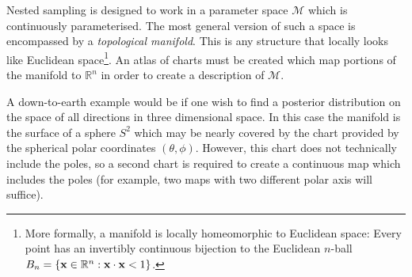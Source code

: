 Nested sampling is designed to work in a parameter space $\mathcal{M}$ which is continuously parameterised. The most general version of such a space is encompassed by a {\em topological manifold}. This is any structure that locally looks like Euclidean space\footnote{More formally, a manifold is locally homeomorphic to Euclidean space: Every point has an invertibly continuous bijection to the Euclidean $n$-ball $B_n = \{ \mathbf{x}\in\mathbb{R}^n : \mathbf{x}\cdot\mathbf{x}<1\}$.}. An atlas of charts must be created which map portions of the manifold to $\mathbb{R}^n$ in order to create a description of $\mathcal{M}$.

A down-to-earth example would be if one wish to find a posterior distribution on the space of all directions in three dimensional space. In this case the manifold is the surface of a sphere $S^2$ which may be nearly covered by the chart provided by the spherical polar coordinates $(\theta,\phi)$. However, this chart does not technically include the poles, so a second chart is required to create a continuous map which includes the poles (for example, two maps with two different polar axis will suffice).



